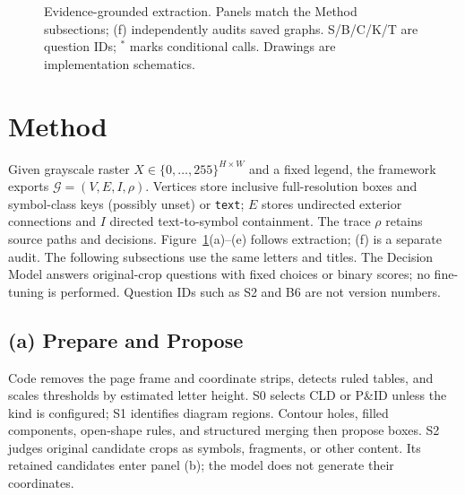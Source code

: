\documentclass[sigconf,review]{acmart}
\begin{document}
\begin{figure}[t]
 \centering
 \resizebox{\textwidth}{!}{}
 \caption{Evidence-grounded extraction. Panels match the Method subsections; (f) independently audits saved graphs. S/B/C/K/T are question IDs; $^*$ marks conditional calls. Drawings are implementation schematics.}
 \label{fig:framework}
\end{figure}

\section{Method}
\label{sec:method}
Given grayscale raster $X\in\{0,\ldots,255\}^{H\times W}$ and a fixed legend, the framework exports $\mathcal G=(V,E,I,\rho)$. Vertices store inclusive full-resolution boxes and symbol-class keys (possibly unset) or \texttt{text}; $E$ stores undirected exterior connections and $I$ directed text-to-symbol containment. The trace $\rho$ retains source paths and decisions. Figure~\ref{fig:framework}(a)--(e) follows extraction; (f) is a separate audit. The following subsections use the same letters and titles. The Decision Model answers original-crop questions with fixed choices or binary scores; no fine-tuning is performed. Question IDs such as S2 and B6 are not version numbers.

\subsection{(a) Prepare and Propose}
\label{sec:prepare}
Code removes the page frame and coordinate strips, detects ruled tables, and scales thresholds by estimated letter height. S0 selects CLD or P\&ID unless the kind is configured; S1 identifies diagram regions. Contour holes, filled components, open-shape rules, and structured merging then propose boxes. S2 judges original candidate crops as symbols, fragments, or other content. Its retained candidates enter panel (b); the model does not generate their coordinates.
\end{document}
